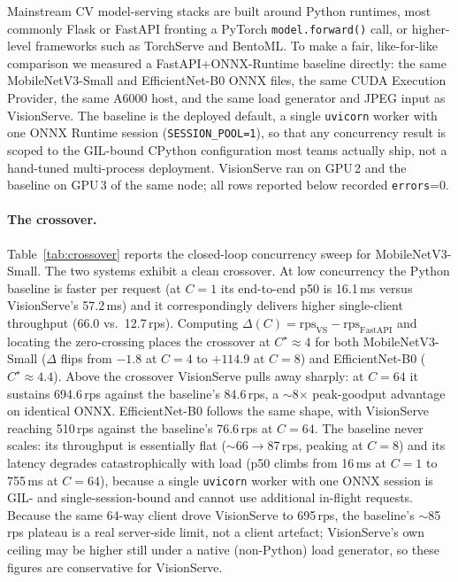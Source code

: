 Mainstream CV model-serving stacks are built around Python runtimes, most commonly
Flask or FastAPI fronting a PyTorch \texttt{model.forward()} call, or higher-level
frameworks such as TorchServe \cite{pytorch2023torchserve} and BentoML.  To make a
fair, like-for-like comparison we measured a FastAPI+ONNX-Runtime baseline directly:
the same MobileNetV3-Small and EfficientNet-B0 ONNX files, the same CUDA
Execution Provider, the same A6000 host, and the same load generator and JPEG input as
VisionServe.  The baseline is the deployed default, a single \texttt{uvicorn} worker
with one ONNX Runtime session (\texttt{SESSION\_POOL=1}), so that any concurrency
result is scoped to the GIL-bound CPython configuration most teams actually ship, not a
hand-tuned multi-process deployment.  VisionServe ran on GPU\,2 and the baseline on
GPU\,3 of the same node; all rows reported below recorded \texttt{errors}=0.

\paragraph{The crossover.}
Table~\ref{tab:crossover} reports the closed-loop concurrency sweep for MobileNetV3-Small.
The two systems exhibit a clean crossover.  At low concurrency the Python baseline
is faster per request (at $C{=}1$ its end-to-end p50 is 16.1\,ms versus VisionServe's
57.2\,ms) and it correspondingly delivers higher single-client throughput (66.0 vs.\
12.7\,rps).  Computing $\Delta(C)=\text{rps}_{\text{VS}}-\text{rps}_{\text{FastAPI}}$ and
locating the zero-crossing places the crossover at $C^\star\!\approx\!4$ for both
MobileNetV3-Small ($\Delta$ flips from $-1.8$ at $C{=}4$ to $+114.9$ at $C{=}8$) and
EfficientNet-B0 ($C^\star\!\approx\!4.4$).  Above the crossover VisionServe pulls away
sharply: at $C{=}64$ it sustains 694.6\,rps against the baseline's 84.6\,rps, a
$\sim$8$\times$ peak-goodput advantage on identical ONNX.  EfficientNet-B0 follows the
same shape, with VisionServe reaching 510\,rps against the baseline's 76.6\,rps at $C{=}64$.
The baseline never scales: its throughput is essentially flat ($\sim$66$\to$87\,rps,
peaking at $C{=}8$) and its latency degrades catastrophically with load (p50 climbs from
16\,ms at $C{=}1$ to 755\,ms at $C{=}64$), because a single \texttt{uvicorn} worker with
one ONNX session is GIL- and single-session-bound and cannot use additional in-flight
requests.  Because the same 64-way client drove VisionServe to 695\,rps, the
baseline's $\sim$85\,rps plateau is a real server-side limit, not a client artefact;
VisionServe's own ceiling may be higher still under a native (non-Python) load generator,
so these figures are conservative for VisionServe.

